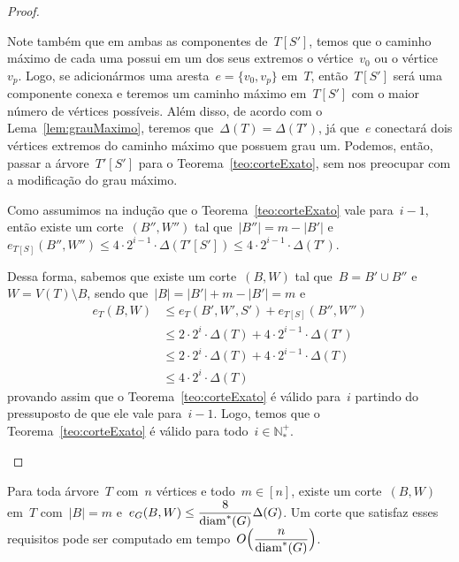 \begin{proof}
\begin{itemize}
			Note também que em ambas as componentes de~$T[S']$, 
			temos que o caminho máximo de cada uma possui em um dos
			seus extremos o vértice~$v_0$ ou o vértice~$v_p$.
			Logo, se adicionármos uma aresta~$e=\{v_0,v_p\}$ em~$T$,
			então~$T[S']$ será uma componente conexa e
			teremos um caminho máximo 
			em~$T[S']$ com o maior número de vértices possíveis.
			Além disso, de acordo com o Lema~\ref{lem:grauMaximo}, 
			teremos que~${\Delta(T) = \Delta(T')}$, já que~$e$ 
			conectará dois vértices extremos do caminho máximo
			que possuem grau um.
			Podemos, então, passar a árvore~$T'[S']$ para o 
			Teorema~\ref{teo:corteExato}, sem nos preocupar com a 
			modificação do grau máximo.
			
			Como assumimos na indução que o Teorema~\ref{teo:corteExato} vale
			para~${i-1}$, então existe um corte~$(B'',W'')$
			tal que~${|B''|=m-|B'|}$ 
			e~${e_{T[S]}(B'',W'')\le 4\cdot 2^{i-1}\cdot
			\Delta(T'[S'])\le 4\cdot 2^{i-1}\cdot\Delta(T')}$.

			Dessa forma, sabemos que existe um corte~$(B,W)$ tal
			que~${B=B'\cup B''}$ e~${W=V(T)\setminus B}$, sendo 
			que~${|B|=|B'| + m-|B'| = m}$ e
			\begin{align}
				e_T(B,W)&\le e_T(B',W',S') + e_{T[S]}(B'',W'') 
				\nonumber\\
				&\le 2\cdot2^i\cdot\Delta(T) + 4\cdot 2^{i-1}\cdot
				\Delta(T')\nonumber\\
				&\le 2\cdot2^i\cdot\Delta(T) + 4\cdot 2^{i-1}\cdot
				\Delta(T)\nonumber\\
				&\le 4\cdot 2^{i}\cdot\Delta(T) \nonumber
			\end{align}
			provando assim que o Teorema~\ref{teo:corteExato} é
			válido para~$i$ partindo do pressuposto de que ele vale
			para~${i-1}$. Logo, temos que o 
			Teorema~\ref{teo:corteExato} é válido para 
			todo~${i\in \mathbb{N^+_*}}$.
			
		\end{itemize}
	\end{proof}

	\bigskip
	\bigskip

	\begin{coro}
		Para toda árvore~$T$ com~$n$ vértices e todo~${m\in[n]}$, existe
		um corte~$(B,W)$ em~$T$ com~${|B|=m}$ 
		e~${e_G(B,W)\le \dfrac{8}{\mathrm{diam}^*(G)}\Delta(G)}$.
		Um corte que satisfaz esses requisitos pode ser computado em 
		tempo~$O\Big(\dfrac{n}{\mathrm{diam}^*(G)}\Big)$.
	\end{coro}

